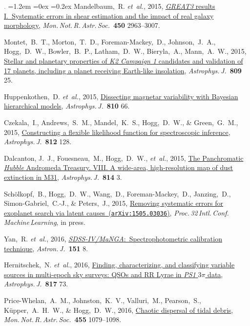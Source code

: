 \documentclass[10pt,letterpaper]{article}
\newcommand{\acronym}[1]{{\small{#1}}}
\newcommand{\foreign}[1]{\textsl{#1}}
\newcommand{\etal}{\foreign{et~al.}}
\newcommand{\project}[1]{\textsl{#1}}
\newcommand{\doi}[2]{\href{http://dx.doi.org/#1}{{#2}}}
\newcommand{\arxiv}[2]{\href{http://arxiv.org/abs/#1}{{#2}\ (\texttt{arXiv:#1})}}
\newcommand{\deemph}[1]{\textcolor{grey}{\footnotesize{#1}}}
\newcommand{\pubnumber}[1]{\deemph{{#1}.}}
\newcounter{refpubnum}
\newcommand{\hogglist}{%
    \rightmargin=0in
    \leftmargin=1.2em
    \topsep=0ex
    \partopsep=0pt
    \itemsep=0.2ex
    \parsep=0pt
    \itemindent=-1.0\leftmargin
    \listparindent=0.0\leftmargin
    \settowidth{\labelsep}{~}
    \usecounter{refpubnum}
  }
\begin{document}
\begin{list}{\pubnumber{\therefpubnum}}{\hogglist}
Mandelbaum,~R. \etal, 2015,
\doi{10.1093/mnras/stv781}{\project{\acronym{GREAT3}} results \acronym{I}.\ Systematic errors in shear
estimation and the impact of real galaxy morphology},
\textit{Mon.\,Not.\,R.\,Astr.\,Soc.}\ \textbf{450} 2963--3007.
\item
Montet,~B.~T., Morton,~T.~D., Foreman-Mackey,~D., Johnson,~J.~A., Hogg,~D.~W.,
Bowler,~B.~P., Latham,~D.~W., Bieryla,~A., Mann,~A.~W., 2015,
\doi{10.1088/0004-637X/809/1/25}{Stellar and planetary properties of
\project{K2 Campaign 1} candidates and validation of 17 planets,
including a planet receiving Earth-like insolation},
\textit{Astrophys.\,J.}\ \textbf{809} 25.
\item
Huppenkothen,~D. \etal, 2015,
\doi{10.1088/0004-637X/810/1/66}{Dissecting magnetar variability with
  Bayesian hierarchical models},
\textit{Astrophys.\,J.}\ \textbf{810} 66.
\item
Czekala,~I., Andrews,~S.~M., Mandel,~K.~S., Hogg,~D.~W., \& Green,~G.~M., 2015,
\doi{10.1088/0004-637X/812/2/128}{Constructing a flexible likelihood
  function for spectroscopic inference},
\textit{Astrophys.\,J.}\ \textbf{812} 128.
\item
Dalcanton, J.~J., Fouesneau,~M., Hogg,~D.~W., \etal, 2015,
\doi{10.1088/0004-637X/814/1/3}{The Panchromatic \project{Hubble} Andromeda Treasury. \acronym{VIII}.
A wide-area, high-resolution map of dust extinction in M31},
\textit{Astrophys.\,J.}\ \textbf{814} 3.
\item
Sch\"olkopf,~B., Hogg,~D.~W., Wang,~D., Foreman-Mackey,~D., Janzing,~D.,
Simon-Gabriel,~C.-J., \& Peters,~J., 2015,
\arxiv{1505.03036}{Removing systematic errors for exoplanet search via latent causes},
\textit{Proc.\,32\,Intl.\,Conf.\,Machine\,Learning}, in press.
\item
Yan,~R. \etal, 2016,
\doi{10.3847/0004-6256/151/1/8}{\project{\acronym{SDSS-IV/MaNGA}}:\ Spectrophotometric calibration technique},
\textit{Astron.\,J.}\ \textbf{151} 8.
\item
Hernitschek,~N. \etal, 2016,
\doi{10.3847/0004-637X/817/1/73}{Finding, characterizing, and classifying variable sources in
multi-epoch sky surveys: QSOs and RR Lyrae in \project{PS1} $3\pi$ data},
\textit{Astrophys.\,J.}\ \textbf{817} 73.
\item
Price-Whelan,~A.~M., Johnston,~K.~V., Valluri,~M., Pearson,~S.,
K\"upper,~A.~H.~W., \& Hogg,~D.~W., 2016,
\doi{10.1093/mnras/stv2383}{Chaotic dispersal of tidal debris},
\textit{Mon.\,Not.\,R.\,Astr.\,Soc.}\ \textbf{455} 1079--1098.
\item

\end{list}
\end{document}

